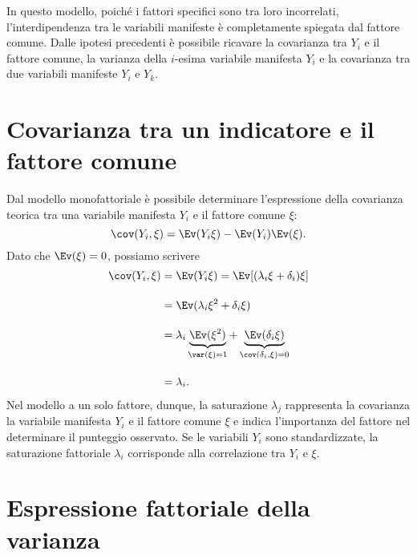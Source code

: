 In questo modello,
poich{\'e} i fattori specifici sono tra loro incorrelati,
l'interdipendenza tra le variabili manifeste {\`e} completamente spiegata dal
fattore comune.
  Dalle ipotesi precedenti è possibile ricavare la covarianza tra $Y_i$ e il fattore comune, la varianza della $i$-esima variabile manifesta $Y_i$ e la covarianza tra due variabili manifeste $Y_i$ e $Y_k$.


\section{Covarianza tra un indicatore e il fattore comune}

Dal modello monofattoriale è  possibile determinare l'espressione della covarianza teorica tra una variabile manifesta $Y_i$ e il fattore comune $\xi$:
$$\cov(Y_i,\xi)=\Ev(Y_i \xi)-\Ev(Y_i)\Ev(\xi).$$ 
 Dato che $\Ev(\xi)=0$, possiamo
 scrivere
\begin{align}
  \cov(Y_i,\xi) &= \Ev(Y_i \xi)=\Ev[(\lambda_i \xi +  \delta_i) \xi]\notag\\[10pt]
  &=\Ev(\lambda_i \xi^2 + \delta_i \xi)\notag\\[10pt]
  &=\lambda_i\underbrace{\Ev(\xi^2)}_{\var(\xi)=1} + \underbrace{ \Ev(\delta_i \xi)}_{\cov(\delta_i, \xi)=0}\notag\\[10pt]
  &= \lambda_i.\notag
\end{align}
Nel modello a un solo fattore, dunque, la saturazione $\lambda_j$ rappresenta la covarianza la variabile manifesta $Y_i$ e il fattore comune $\xi$ e indica l'importanza del fattore nel determinare il punteggio osservato. 
 Se le variabili $Y_i$ sono standardizzate, la saturazione fattoriale $\lambda_i$ corrisponde alla correlazione tra $Y_i$ e $\xi$.


\section{Espressione fattoriale della varianza}

